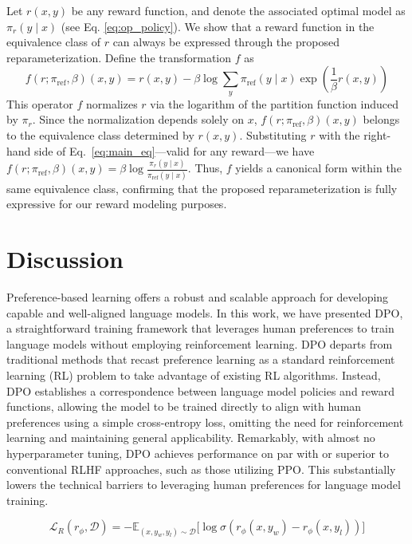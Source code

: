 \begin{sproof}
    Let $r(x, y)$ be any reward function, and denote the associated optimal model as $\pi_r(y \mid x)$ (see Eq. \ref{eq:op_policy}). We show that a reward function in the equivalence class of $r$ can always be expressed through the proposed reparameterization. Define the transformation $f$ as
\begin{equation}
    f(r; \pi_\text{ref}, \beta)(x, y) = r(x, y) - \beta\log\sum_{y}\pi_\text{ref}(y\mid x)\exp\left(\frac{1}{\beta}r(x, y)\right)
\end{equation}
This operator $f$ normalizes $r$ via the logarithm of the partition function induced by $\pi_r$. Since the normalization depends solely on $x$, $f(r; \pi_\text{ref}, \beta)(x, y)$ belongs to the equivalence class determined by $r(x, y)$. Substituting $r$ with the right-hand side of Eq.~\ref{eq:main_eq}—valid for any reward—we have $f(r; \pi_\text{ref}, \beta)(x, y) = \beta \log \frac{\pi_r(y\mid x)}{\pi_\text{ref}(y\mid x)}$. Thus, $f$ yields a canonical form within the same equivalence class, confirming that the proposed reparameterization is fully expressive for our reward modeling purposes.
\end{sproof}

\section{Discussion}
Preference-based learning offers a robust and scalable approach for developing capable and well-aligned language models. In this work, we have presented DPO, a straightforward training framework that leverages human preferences to train language models without employing reinforcement learning. DPO departs from traditional methods that recast preference learning as a standard reinforcement learning (RL) problem to take advantage of existing RL algorithms. Instead, DPO establishes a correspondence between language model policies and reward functions, allowing the model to be trained directly to align with human preferences using a simple cross-entropy loss, omitting the need for reinforcement learning and maintaining general applicability. Remarkably, with almost no hyperparameter tuning, DPO achieves performance on par with or superior to conventional RLHF approaches, such as those utilizing PPO. This substantially lowers the technical barriers to leveraging human preferences for language model training.

\begin{equation}\label{eq:reward_model}
    \mathcal{L}_R(r_{\phi}, \mathcal{D}) = -\mathbb{E}_{(x, y_w, y_l)\sim \mathcal{D}}\bigl[\log \sigma(r_{\phi}(x, y_w)- r_{\phi}(x, y_l))\bigr]
\end{equation}

